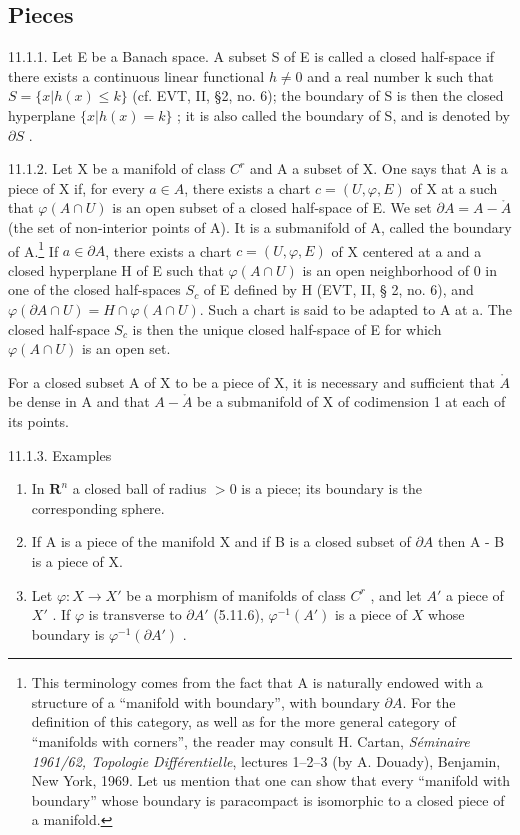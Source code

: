 \subsection{Pieces}

11.1.1. Let E be a Banach space. A subset S of E is called a closed half-space if there exists a continuous linear functional \(h \neq 0\) and a real number k such that \(S = \{x|h(x) \leqslant k\}\) (cf. EVT, II, §2, no. 6); the boundary of S is then the closed hyperplane \(\{x|h(x) = k\}\) ; it is also called the boundary of S, and is denoted by \(\partial S\) .

11.1.2. Let X be a manifold of class \(C^{r}\) and A a subset of X. One says that A is a piece of X if, for every \(a \in A\), there exists a chart \(c = (U, \varphi, E)\) of X at a such that \(\varphi(A \cap U)\) is an open subset of a closed half-space of E. We set \(\partial A = A - \mathring{A}\) (the set of non-interior points of A). It is a submanifold of A, called the boundary of A.\footnote{This terminology comes from the fact that A is naturally endowed with a structure of a “manifold with boundary”, with boundary \(\partial A\). For the definition of this category, as well as for the more general category of “manifolds with corners”, the reader may consult H. Cartan, \emph{Séminaire 1961/62, Topologie Différentielle}, lectures 1–2–3 (by A. Douady), Benjamin, New York, 1969. Let us mention that one can show that every “manifold with boundary” whose boundary is paracompact is isomorphic to a closed piece of a manifold.} If \(a \in \partial A\), there exists a chart \(c = (U, \varphi, E)\) of X centered at a and a closed hyperplane H of E such that \(\varphi(A \cap U)\) is an open neighborhood of 0 in one of the closed half-spaces \(S_{c}\) of E defined by H (EVT, II, § 2, no. 6), and \(\varphi(\partial A \cap U) = H \cap \varphi(A \cap U)\). Such a chart is said to be adapted to A at a. The closed half-space \(S_{c}\) is then the unique closed half-space of E for which \(\varphi(A \cap U)\) is an open set.

For a closed subset A of X to be a piece of X, it is necessary and sufficient that \(\mathring{A}\) be dense in A and that \(A-\mathring{A}\) be a submanifold of X of codimension 1 at each of its points.

11.1.3. Examples

\begin{enumerate}
\def\labelenumi{\alph{enumi})}
\item
  In \(\mathbf{R}^{n}\) a closed ball of radius \(>0\) is a piece; its boundary is the corresponding sphere.
\item
  If A is a piece of the manifold X and if B is a closed subset of \(\partial A\) then A - B is a piece of X.
\item
  Let \(\varphi: X \to X'\) be a morphism of manifolds of class \(C^r\) , and let \(A'\) a piece of \(X'\) . If \(\varphi\) is transverse to \(\partial A'\) (5.11.6), \(\varphi^{-1}(A')\) is a piece of \(X\) whose boundary is \(\varphi^{-1}(\partial A')\) .
\end{enumerate}

